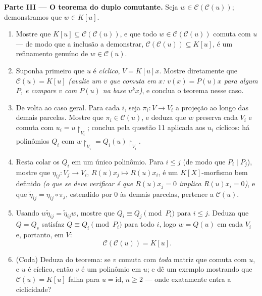 \begin{problem}
\medskip
\noindent\textbf{Parte III --- O teorema do duplo comutante.}
Seja $w \in \mathcal C(\mathcal C(u))$; demonstramos que $w \in K[u]$.
\begin{enumerate}[resume]
  \item Mostre que $K[u] \subseteq \mathcal C(\mathcal C(u))$, e que todo $w \in \mathcal C(\mathcal C(u))$ comuta com $u$ --- de
        modo que a inclusão a demonstrar, $\mathcal C(\mathcal C(u)) \subseteq K[u]$, é um refinamento
        genuíno de $w \in \mathcal C(u)$.
  \item Suponha primeiro que $u$ é \emph{cíclico}, $V = K[u]x$. Mostre
        diretamente que $\mathcal C(u) = K[u]$ \emph{(avalie um $v$ que comuta em
        $x$: $v(x) = P(u)x$ para algum $P$, e compare $v$ com
        $P(u)$ na base $u^k x$)}, e conclua o teorema nesse
        caso.
  \item De volta ao caso geral. Para cada $i$, seja $\pi_i\colon
        V \to V_i$ a
        projeção ao longo das demais parcelas. Mostre que $\pi_i \in \mathcal C(u)$, e
        deduza que $w$ preserva cada $V_i$ e comuta com $u_i =
        u\restriction_{V_i}$;
        conclua pela questão 11 aplicada aos $u_i$ cíclicos: há
        polinômios $Q_i$ com $w\restriction_{V_i} = Q_i(u)\restriction_{V_i}$.
  \item Resta colar os $Q_i$ em um único polinômio. Para $i
        \leq j$ (de
        modo que $P_i \mid P_j$), mostre que $\eta_{ij} \colon
        V_j \to V_i$, $R(u)x_j \mapsto R(u)x_i$, é um
        $K[X]$-morfismo bem definido \emph{(o que se deve verificar
        é que $R(u)x_j = 0$ implica $R(u)x_i = 0$)}, e que $\tilde\eta_{ij} = \eta_{ij}\circ\pi_j$, estendido por $0$
        às demais parcelas, pertence a $\mathcal C(u)$.
  \item Usando $w\tilde\eta_{ij} = \tilde\eta_{ij}w$, mostre que $Q_i
        \equiv Q_j \pmod{P_i}$ para $i \leq j$. Deduza que $Q =
        Q_s$
        satisfaz $Q \equiv Q_i \pmod {P_i}$ para todo $i$, logo $w = Q(u)$ em cada $V_i$
        e, portanto, em $V$:
        \[
        \boxed{\ \mathcal C(\mathcal C(u)) = K[u].\ }
        \]
  \item (Coda) Deduza do teorema: se $v$ comuta com \emph{toda}
        matriz que comuta com $u$, e $u$ é cíclico, então
        $v$ é um polinômio em $u$; e dê um exemplo mostrando que
        $\mathcal C(u) = K[u]$ falha para $u =
        \mathrm{id}$, $n \geq 2$ --- onde exatamente entra a
        ciclicidade?
\end{enumerate}


\end{problem}
